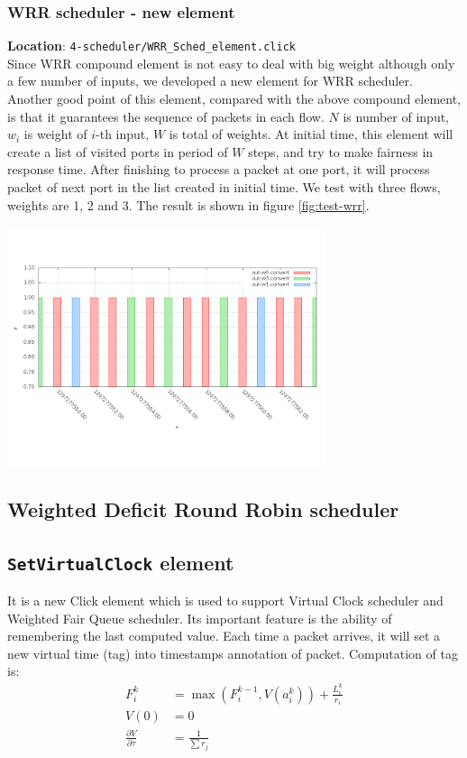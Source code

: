 \documentclass[a4paper]{article}
\begin{document}
  \subsubsection{WRR scheduler - new element}
  \textbf{Location}: \texttt{4-scheduler/WRR\_Sched\_element.click}\\  
  Since WRR compound element is not easy to deal with big weight although only a few number of inputs, we developed a new element for WRR scheduler. Another good point of this element, compared with the above compound element, is that it guarantees the sequence of packets in each flow. $N$ is number of input, $w_i$ is weight of $i$-th input, $W$ is total of weights. At initial time, this element will create a list of visited ports in period of $W$ steps, and try to make fairness in response time. After finishing to process a packet at one port, it will process packet of next port in the list created in initial time. We test with three flows, weights are 1, 2 and 3. The result is shown in figure \ref{fig:test-wrr}.
  \begin{center}
	\includegraphics[width=0.70\textwidth]{wrr-dense.png}
	\label{fig:test-wrr}
  \end{center}

  \subsection{Weighted Deficit Round Robin scheduler}

  \subsection{\texttt{SetVirtualClock} element} \label{section:virtualclock}
  It is a new Click element which is used to support Virtual Clock scheduler and Weighted Fair Queue scheduler. Its important feature is the ability of remembering the last computed value. Each time a packet arrives, it will set a new virtual time (tag) into timestamps annotation of packet. Computation of tag is: \\ 
  \begin{align*}
  F_{i}^{k} &= \max(F_{i}^{k-1}, V(a_{i}^{k})) + \frac{L_{i}^{k}}{r_i}\\
  V(0) &= 0 \\
  \frac{\partial V}{\partial \tau} &= \frac{1}{\sum r_j} \\
  \end{align*}
  
\end{document}
